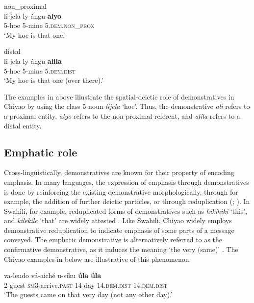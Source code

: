 \documentclass[output=paper,
            colorlinks, citecolor=brown
            ,draftmode
		  ]{langscibook}
\begin{document}
     \newpage
    \ex\label{ex:taji:31b} non\_proximal\\
    \gll li-jela    ly-ángu        \textbf{alyo}\\
        5-hoe    5-mine      5.\textsc{dem.non\_prox}\\
     \glt ‘My hoe is that one.’

    \ex\label{ex:taji:31c} distal\\
    \gll li-jela    ly-ángu      \textbf{alila}\\
        5-hoe    5-mine    5.\textsc{dem.dist}\\
     \glt ‘My hoe is that one (over there).’ 
     \z
\z

The examples in  above illustrate the spatial-deictic role of demonstratives in Chiyao by using the class 5 noun \textit{lijela} ‘hoe’. Thus, the demonstrative \textit{ali}  refers to a proximal entity, \textit{alyo}  refers to the non-proximal referent, and \textit{alila}  refers to a distal entity.   

\subsection{Emphatic role}\label{sec:taji:6.2}

Cross-linguistically, demonstratives are known for their property of encoding emphasis. In many languages, the expression of emphasis through demonstratives is done by reinforcing the existing demonstrative morphologically, through for example, the addition of further deictic particles, or through reduplication (\citealt{Lyons1999}; ). In Swahili, for example, reduplicated forms of demonstratives such as \textit{hikihiki} ‘this’, and \textit{kilekile} ‘that’ are widely attested \citep[116]{Lyons1999}. Like Swahili, Chiyao widely employs demonstrative reduplication to indicate emphasis of some parts of a message conveyed. The emphatic demonstrative is alternatively referred to as the confirmative demonstrative, as it induces the meaning ‘the very (same)’ \citep{Floor1998}. The Chiyao examples in  below are illustrative of this phenomenon.

\ea%
    \label{ex:taji:32}
    \ea\label{ex:taji:32a} \gll  va-lendo      vá-aiché                    u-síku          \textbf{úla}                          \textbf{úla}\\
      2-guest        \textsc{sm3}-arrive.\textsc{past}    14-day        14.\textsc{dem.dist}      14.\textsc{dem.dist}\\
    \glt ‘The guests came on that very day (not any other day).’
\end{document}
